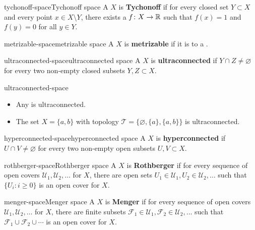 \begin{topic}{tychonoff-space}{Tychonoff space}
    A  $X$ is \textbf{Tychonoff} if for every closed set $Y \subset X$ and every point $x \in X \setminus Y$, there exists a  $f \colon X \to \mathbb{R}$ such that $f(x) = 1$ and $f(y) = 0$ for all $y \in Y$.
\end{topic}

\begin{topic}{metrizable-space}{metrizable space}
    A  $X$ is \textbf{metrizable} if it is  to a .
\end{topic}

\begin{topic}{ultraconnected-space}{ultraconnected space}
    A  $X$ is \textbf{ultraconnected} if $Y \cap Z \ne \varnothing$ for every two non-empty closed subsets $Y, Z \subset X$.
\end{topic}

\begin{example}{ultraconnected-space}
    \begin{itemize}
        \item Any  is ultraconnected.
        \item The set $X = \{ a, b \}$ with topology $\mathcal{T} = \{ \varnothing, \{ a \}, \{ a, b \} \}$ is ultraconnected.
    \end{itemize}
\end{example}

\begin{topic}{hyperconnected-space}{hyperconnected space}
    A  $X$ is \textbf{hyperconnected} if $U \cap V \ne \varnothing$ for every two non-empty open subsets $U, V \subset X$.
\end{topic}

\begin{topic}{rothberger-space}{Rothberger space}
    A  $X$ is \textbf{Rothberger} if for every sequence of open covers $\mathcal{U}_1, \mathcal{U}_2, \ldots$ for $X$, there are open sets $U_1 \in \mathcal{U}_1, U_2 \in \mathcal{U}_2, \ldots$ such that $\{ U_i : i \ge 0 \}$ is an open cover for $X$.
\end{topic}

\begin{topic}{menger-space}{Menger space}
    A  $X$ is \textbf{Menger} if for every sequence of open covers $\mathcal{U}_1, \mathcal{U}_2, \ldots$ for $X$, there are finite subsets $\mathcal{F}_1 \in \mathcal{U}_1, \mathcal{F}_2 \in \mathcal{U}_2, \ldots$ such that $\mathcal{F}_1 \cup \mathcal{F}_2 \cup \cdots$ is an open cover for $X$.
\end{topic}

